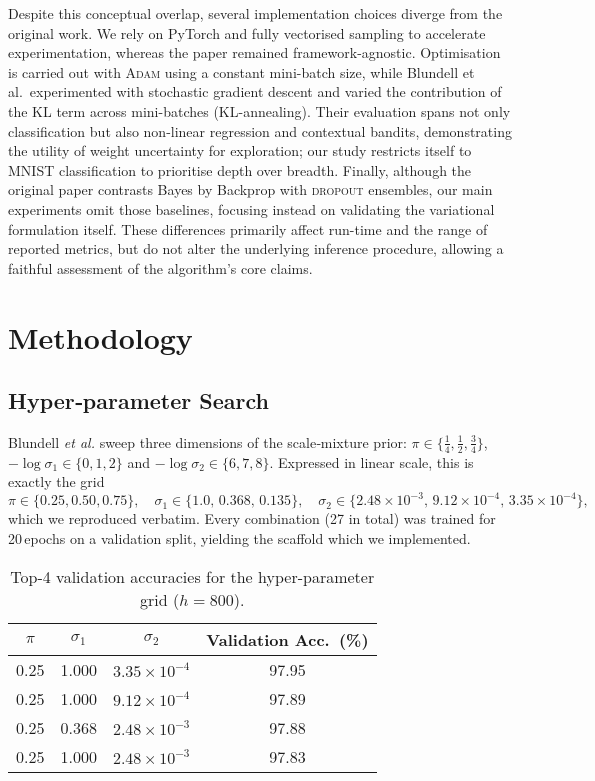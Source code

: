 \documentclass{article}
\begin{document}
Despite this conceptual overlap, several implementation choices diverge from the original work.  
We rely on PyTorch and fully vectorised sampling to accelerate experimentation, whereas the paper remained framework-agnostic.  
Optimisation is carried out with \textsc{Adam} using a constant mini-batch size, while Blundell et al.\ experimented with stochastic gradient descent and varied the contribution of the KL term across mini-batches (KL-annealing).  
Their evaluation spans not only classification but also non-linear regression and contextual bandits, demonstrating the utility of weight uncertainty for exploration; our study restricts itself to MNIST classification to prioritise depth over breadth.  
Finally, although the original paper contrasts Bayes by Backprop with \textsc{dropout} ensembles, our main experiments omit those baselines, focusing instead on validating the variational formulation itself.  
These differences primarily affect run-time and the range of reported metrics, but do not alter the underlying inference procedure, allowing a faithful assessment of the algorithm’s core claims.


\section{Methodology}

\subsection{Hyper‑parameter Search}

Blundell \textit{et al.} sweep three dimensions of the scale‑mixture prior: $\pi\!\in\!\{ \tfrac14,\tfrac12,\tfrac34\}$, $-\!\log\sigma_1\!\in\!\{0,1,2\}$ and $-\!\log\sigma_2\!\in\!\{6,7,8\}$.  
Expressed in linear scale, this is exactly the grid
\[
\pi\in\{0.25,0.50,0.75\},\quad
\sigma_1\in\{1.0,\,0.368,\,0.135\},\quad
\sigma_2\in\{2.48\!\times\!10^{-3},\,9.12\!\times\!10^{-4},\,3.35\!\times\!10^{-4}\},
\]
which we reproduced verbatim.  
Every combination (27 in total) was trained for 20\,epochs on a validation split, yielding the scaffold which we implemented. 
\begin{table}[h]
\centering
\caption{Top-4 validation accuracies for the hyper-parameter grid ($h=800$).}
\label{tab:hp}
\begin{tabular}{cccc}
\toprule
$\pi$ & $\sigma_1$ & $\sigma_2$ & Validation Acc.\ (\%) \\
\midrule
0.25 & 1.000 & $3.35\times10^{-4}$ & 97.95 \\
0.25 & 1.000 & $9.12\times10^{-4}$ & 97.89 \\
0.25 & 0.368 & $2.48\times10^{-3}$ & 97.88 \\
0.25 & 1.000 & $2.48\times10^{-3}$ & 97.83 \\
\bottomrule
\end{tabular}
\end{table}
\end{document}
